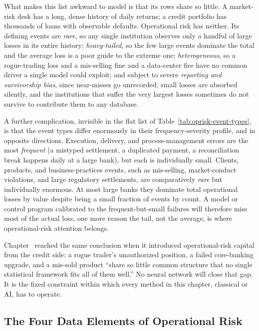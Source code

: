 \documentclass[../ai_in_finance]{subfiles}
\begin{document}
What makes this list awkward to model is that its rows share so little. A market-risk desk has a long, dense history of daily returns; a credit portfolio has thousands of loans with observable defaults. Operational risk has neither. Its defining events are \emph{rare}, so any single institution observes only a handful of large losses in its entire history; \emph{heavy-tailed}, so the few large events dominate the total and the average loss is a poor guide to the extreme one; \emph{heterogeneous}, so a rogue-trading loss and a mis-selling fine and a data-center fire have no common driver a single model could exploit; and subject to severe \emph{reporting and survivorship bias}, since near-misses go unrecorded, small losses are absorbed silently, and the institutions that suffer the very largest losses sometimes do not survive to contribute them to any database.

A further complication, invisible in the flat list of Table~\ref{tab:oprisk-event-types}, is that the event types differ enormously in their frequency-severity profile, and in opposite directions. Execution, delivery, and process-management errors are the most \emph{frequent} (a mistyped settlement, a duplicated payment, a reconciliation break happens daily at a large bank), but each is individually small. Clients, products, and business-practices events, such as mis-selling, market-conduct violations, and large regulatory settlements, are comparatively \emph{rare} but individually enormous. At most large banks they dominate total operational losses by value despite being a small fraction of events by count. A model or control program calibrated to the frequent-but-small failures will therefore miss most of the actual loss, one more reason the tail, not the average, is where operational-risk attention belongs.

Chapter~ reached the same conclusion when it introduced operational-risk capital from the credit side: a rogue trader's unauthorized position, a failed core-banking upgrade, and a mis-sold product ``share so little common structure that no single statistical framework fits all of them well.'' No neural network will close that gap. It is the fixed constraint within which every method in this chapter, classical or AI, has to operate.

\subsection{The Four Data Elements of Operational Risk}
\label{sec:oprisk-data}
\end{document}
